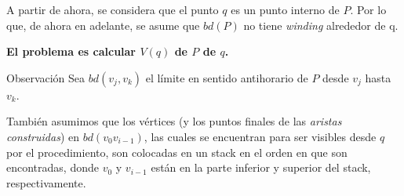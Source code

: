 \documentclass[aspectratio=169,xcolor=dvipsnames, t]{beamer}
\begin{document}

\begin{frame}[c]
    A partir de ahora, se considera que el punto $q$ es un punto interno de $P$. Por lo que, de ahora en adelante, se asume que $bd(P)$ no tiene \textit{winding} alrededor de q.
    \vspace{0.5cm}
    \begin{center}
        \textbf{El problema es calcular $V(q)$ de $P$ de $q$.}
    \end{center}
\end{frame}




\begin{frame}[c]
   \begin{block}{Observación}
       Sea $bd(v_{j}, v_{k})$ el límite en sentido antihorario de $P$ desde $v_{j}$ hasta $v_{k}$.    
   \end{block}
   \vspace{0.5cm}
   También asumimos que los vértices (y los puntos finales de las \textit{aristas construidas}) en $bd(v_{0} v_{i-1})$, las cuales se encuentran para ser visibles desde $q$ por el procedimiento, son colocadas en un stack en el orden en que son encontradas, donde $v_{0}$ y $v_{i-1}$ están en la parte inferior y superior del stack, respectivamente.\\  
\end{frame}

\end{document}
